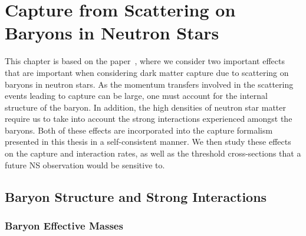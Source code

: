\graphicspath{{img/capture_baryons/}}
\chapter{Capture from Scattering on Baryons in Neutron Stars}
\label{chapter:capture_baryons}

\begin{synopsis}
   This chapter is based on the paper~\cite{Anzuini:2021lnv_nov_Improvedtreatmentdark}, where we consider two important effects that are important when considering dark matter capture due to scattering on baryons in neutron stars. 
   As the momentum transfers involved in the scattering events leading to capture can be large, one must account for the internal structure of the baryon. In addition, the high densities of neutron star matter require us to take into account the strong interactions experienced amongst the baryons. Both of these effects are incorporated into the capture formalism presented in this thesis in a self-consistent manner.
   We then study these effects on the capture and interaction rates, as well as the threshold cross-sections that a future NS observation would be sensitive to. 
\end{synopsis}


\section{Baryon Structure and Strong Interactions}
\label{ch5:sec:baryons_in_NSs}

\subsection{Baryon Effective Masses}
\label{ch5:subsec:strong_ints_meffs}

